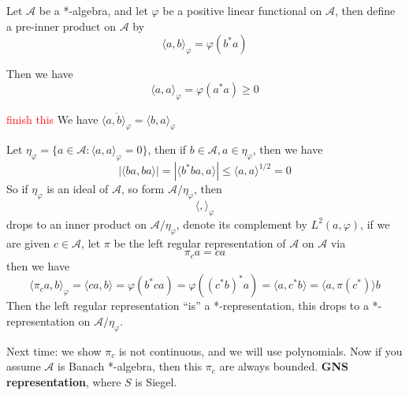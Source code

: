 Let $\mathcal{A}$ be a *-algebra, and let $\varphi$ be a positive linear functional on $\mathcal{A}$, then define a pre-inner product on $\mathcal{A}$ by
\begin{equation*}
    \langle a, b\rangle_\varphi=\varphi(b^*a)
\end{equation*}

Then we have
\begin{equation*}
    \langle a, a\rangle_\varphi=\varphi(a^*a)\geq 0
\end{equation*}
\begin{exercise}
\textcolor{red}{finish this}
    We have $\overline{\langle a,b\rangle_\varphi}=\langle b, a\rangle_\varphi$
\end{exercise}
Let $\eta_\varphi=\{a\in\mathcal{A}: \langle a, a\rangle_\varphi=0\} $, then if $b\in\mathcal{A}, a\in\eta_\varphi$, then we have
\begin{equation*}
    |\langle ba, ba\rangle|=|\langle b^*ba, a\rangle|\leq \langle a, a\rangle^{1/2}=0
\end{equation*}
So if $\eta_\varphi$ is an ideal of $\mathcal{A}$, so form $\mathcal{A}/\eta_\varphi$, then
\begin{equation*}
    \langle, \rangle_\varphi
\end{equation*}
drops to an inner product on $\mathcal{A}/\eta_\varphi$, denote its complement by $L^2(a,\varphi)$, if we are given $c\in\mathcal{A}$, let $\pi$ be the left regular representation of $\mathcal{A}$ on $\mathcal{A}$ via
\begin{equation*}
    \pi_ca=ca
\end{equation*}
then we have
\begin{equation*}
    \langle \pi_ca, b\rangle_\varphi=\langle ca, b\rangle=\varphi(b^*ca)=\varphi((c^*b)^*a)=\langle a, c^*b\rangle=\langle a, \pi(c^*)\rangle b
\end{equation*}
Then the left regular representation ``is'' a *-representation, this drops to a *-representation on $\mathcal{A}/\eta_\varphi$.

Next time: we show $\pi_c$ is not continuous, and we will use polynomials. Now if you assume $\mathcal{A}$ is Banach *-algebra, then this $\pi_c$ are always bounded.
\textbf{GNS representation}, where $S$ is Siegel. 